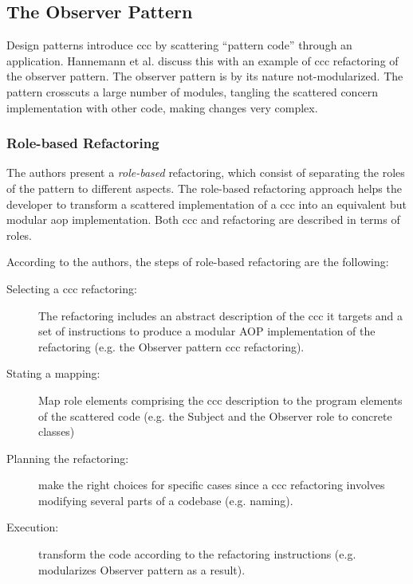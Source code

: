 \subsection{The Observer Pattern}\label{The Observer Pattern}
Design patterns introduce \ac{ccc} by scattering ``pattern code'' through an application.
Hannemann et al. \cite{hannemann2005role} discuss this with an example of \ac{ccc} refactoring of the observer pattern.
The observer pattern is by its nature not-modularized. 
The pattern crosscuts a large number of modules, tangling the scattered concern implementation with other code, making changes very complex. 

\subsubsection{Role-based Refactoring}
The authors present a \textit{role-based} refactoring, which consist of separating the roles of the pattern to different aspects.
The role-based refactoring approach helps the developer to transform a scattered implementation of a \ac{ccc} into an equivalent but modular \ac{aop} implementation. 
Both \ac{ccc} and refactoring are described in terms of roles. 

According to the authors\cite{hannemann2005role}, the steps of role-based refactoring are the following:
\begin{description}

	\item [Selecting a \ac{ccc} refactoring:] The refactoring includes an abstract description of the \ac{ccc} it targets and a set of instructions to produce a modular AOP implementation of the refactoring (e.g. the Observer pattern \ac{ccc} refactoring).

	\item [Stating a mapping:] Map role elements comprising the \ac{ccc} description to the program elements of the scattered code (e.g. the Subject and the Observer role to concrete classes)

	\item [Planning the refactoring:] make the right choices for specific cases since a \ac{ccc} refactoring involves modifying several parts of a codebase (e.g. naming).

	\item [Execution:] transform the code according to the refactoring instructions (e.g. modularizes Observer pattern as a result).
\end{description}

